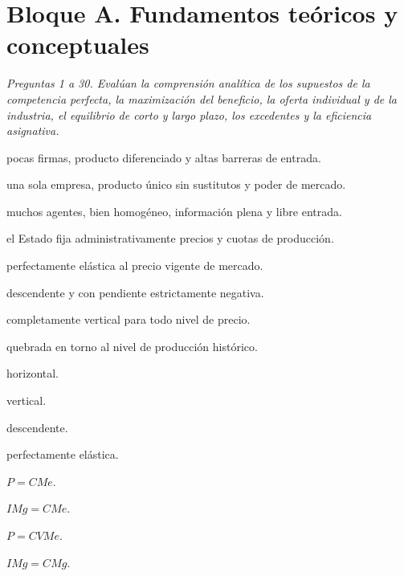 \section*{Bloque A. Fundamentos teóricos y conceptuales}

\noindent\textit{Preguntas 1 a 30. Evalúan la comprensión analítica de los supuestos de la competencia perfecta, la maximización del beneficio, la oferta individual y de la industria, el equilibrio de corto y largo plazo, los excedentes y la eficiencia asignativa.}

\begin{opts}
    \item pocas firmas, producto diferenciado y altas barreras de entrada.
    \item una sola empresa, producto único sin sustitutos y poder de mercado.
    \item muchos agentes, bien homogéneo, información plena y libre entrada.
    \item el Estado fija administrativamente precios y cuotas de producción.
\end{opts}

\begin{opts}
    \item perfectamente elástica al precio vigente de mercado.
    \item descendente y con pendiente estrictamente negativa.
    \item completamente vertical para todo nivel de precio.
    \item quebrada en torno al nivel de producción histórico.
\end{opts}

\begin{opts}
    \item horizontal.
    \item vertical.
    \item descendente.
    \item perfectamente elástica.
\end{opts}

\begin{opts}
    \item $P=CMe$.
    \item $IMg=CMe$.
    \item $P=CVMe$.
    \item $IMg=CMg$.
\end{opts}

